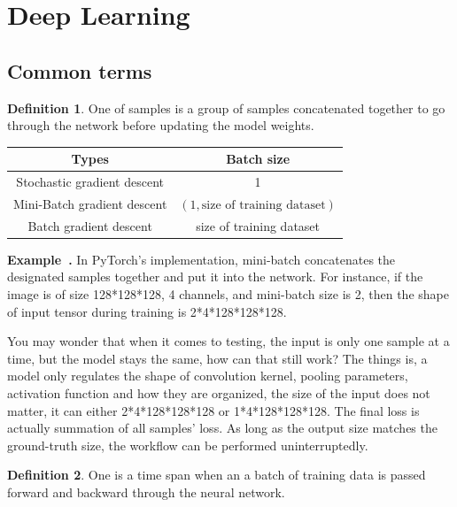 \documentclass[a4paper]{article}
\theoremstyle{definition}
\newtheorem{definition}{Definition}
\theoremstyle{plain}
\newenvironment{example}[1][]{\refstepcounter{example}\par\medskip
   \noindent \textbf{Example~\theexample. #1} \rmfamily}{\medskip}
\newcounter{example}{Example}
\begin{document}
\newpage
\section{Deep Learning}
\subsection{Common terms}
\begin{definition}
One  of samples is a group of samples concatenated together to go through the network before updating the model weights.
\end{definition}

\begin{table}[H]
\centering
\begin{tabular}{cc}
\hline
{ \textbf{Types}}              & { \textbf{Batch size}}                    \\ \hline
Stochastic gradient descent & 1 \\
Mini-Batch gradient descent & $(1, \text{size of training dataset})$\\
Batch gradient descent      & size of training dataset \\ \hline
\end{tabular}
\end{table}

\begin{example}
In PyTorch's implementation, mini-batch concatenates the designated samples together and put it into the network. For instance, if the image is of size 128*128*128, 4 channels, and mini-batch size is 2, then the shape of input tensor during training is 2*4*128*128*128. 

You may wonder that when it comes to testing, the input is only one sample at a time, but the model stays the same, how can that still work? The things is, a model only regulates the shape of convolution kernel, pooling parameters, activation function and how they are organized, the size of the input does not matter, it can either 2*4*128*128*128 or 1*4*128*128*128. The final loss is actually summation of all samples' loss. As long as the output size matches the ground-truth size, the workflow can be performed uninterruptedly.
\end{example}

\begin{definition}
One  is a time span when an a batch of training data is passed forward and backward through the neural network.
\end{definition}
\end{document}
